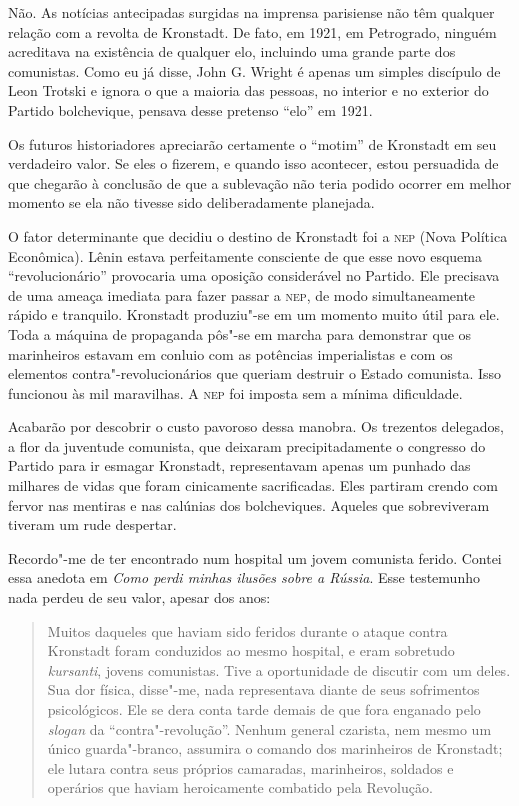 Não. As notícias antecipadas surgidas na imprensa parisiense não têm
qualquer relação com a revolta de Kronstadt. De fato, em 1921, em
Petrogrado, ninguém acreditava na existência de qualquer elo,
incluindo uma grande parte dos comunistas. Como eu já disse, John G.
Wright é apenas um simples discípulo de Leon Trotski e ignora o que a
maioria das pessoas, no interior e no exterior do Partido bolchevique,
pensava desse pretenso “elo” em 1921.

Os futuros historiadores apreciarão certamente o “motim” de Kronstadt em
seu verdadeiro valor. Se eles o fizerem, e quando isso acontecer,
estou persuadida de que chegarão à conclusão de que a sublevação não
teria podido ocorrer em melhor momento se ela não tivesse sido
deliberadamente planejada.

O fator determinante que decidiu o destino de Kronstadt foi a \textsc{nep}
(Nova Política Econômica). Lênin estava perfeitamente consciente de que
esse novo esquema “revolucionário” provocaria uma oposição considerável
no Partido. Ele precisava de uma ameaça imediata para fazer passar a
\textsc{nep}, de modo simultaneamente rápido e tranquilo. Kronstadt
produziu"-se em um momento muito útil para ele. Toda a máquina de
propaganda pôs"-se em marcha para demonstrar que os marinheiros
estavam em conluio com as potências imperialistas e com os elementos
contra"-revolucionários que queriam destruir o Estado comunista. Isso
funcionou às mil maravilhas. A \textsc{nep} foi imposta sem a mínima
dificuldade.

Acabarão por descobrir o custo pavoroso dessa manobra. Os trezentos
delegados, a flor da juventude comunista, que deixaram precipitadamente
o congresso do Partido para ir esmagar Kronstadt, representavam apenas
um punhado das milhares de vidas que foram cinicamente sacrificadas.
Eles partiram crendo com fervor nas mentiras e nas calúnias dos
bolcheviques. Aqueles que sobreviveram tiveram um rude despertar.

Recordo"-me de ter encontrado num hospital um jovem comunista ferido.
Contei essa anedota em \textit{Como perdi minhas ilusões sobre a Rússia}. Esse
testemunho nada perdeu de seu valor, apesar dos anos:

\begin{quote}
Muitos daqueles que haviam sido feridos durante o ataque contra
Kronstadt foram conduzidos ao mesmo hospital, e eram sobretudo
\textit{kursanti}, jovens comunistas. Tive a oportunidade de discutir com um
deles. Sua dor física, disse"-me, nada representava diante de seus
sofrimentos psicológicos. Ele se dera conta tarde demais de que fora
enganado pelo \textit{slogan} da “contra"-revolução”. Nenhum general
czarista, nem mesmo um único guarda"-branco, assumira o comando dos
marinheiros de Kronstadt; ele lutara contra seus próprios camaradas,
marinheiros, soldados e operários que haviam heroicamente combatido
pela Revolução.
\end{quote}

